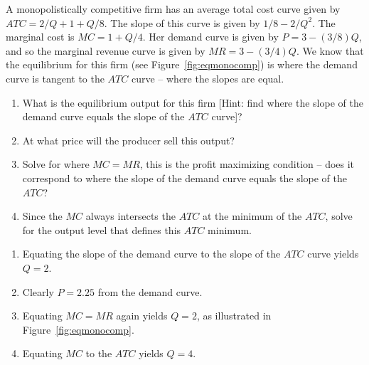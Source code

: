 \begin{enumialphparenastyle}
\begin{ex}\label{ex:ch11ex12}
A monopolistically competitive firm has an average total cost curve given by $ATC=2/Q+1+Q/8$. The slope of this curve is given by $1/8-2/Q^2$. The marginal cost is $MC=1+Q/4$.  Her demand curve is given by $P=3-(3/8)Q$, and so the marginal revenue curve is given by $MR=3-(3/4)Q$. We know that the equilibrium for this firm (see Figure~\ref{fig:eqmonocomp}) is where the demand curve is tangent to the $ATC$ curve -- where the slopes are equal.
\begin{enumerate}
	\item	What is the equilibrium output for this firm [Hint: find where the slope of the demand curve equals the slope of the $ATC$ curve]?
	\item	At what price will the producer sell this output?
	\item	Solve for where $MC=MR$, this is the profit maximizing condition -- does it correspond to where the slope of the demand curve equals the slope of the $ATC$?
	\item	Since the $MC$ always intersects the $ATC$ at the minimum of the $ATC$, solve for the output level that defines this $ATC$ minimum.
\end{enumerate}
\begin{sol}
\begin{enumerate}
	\item	Equating the slope of the demand curve to the slope of the $ATC$ curve yields $Q=2$.
	\item	Clearly $P=2.25$ from the demand curve.
	\item	Equating $MC=MR$ again yields $Q=2$, as illustrated in Figure~\ref{fig:eqmonocomp}.
	\item	Equating $MC$ to the $ATC$ yields $Q=4$.
\end{enumerate}
\end{sol}
\end{ex}


\end{enumialphparenastyle}